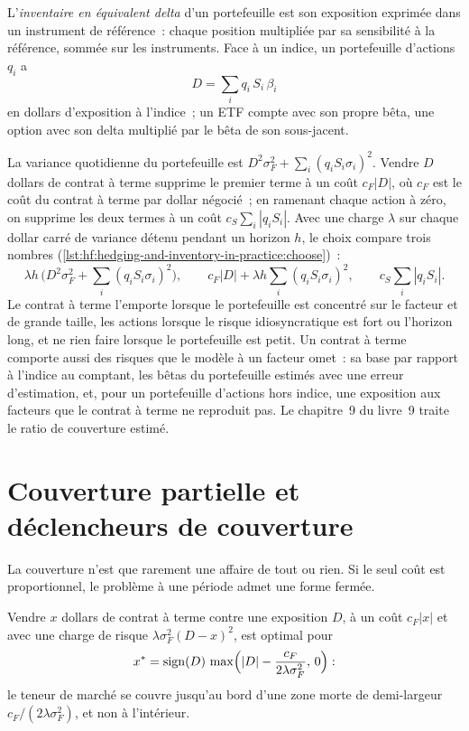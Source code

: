 \begin{definition}\label{def:hf:hedging-and-inventory-in-practice:delta}
L'\emph{inventaire en équivalent delta} d'un portefeuille est son exposition exprimée dans un instrument de référence~: chaque
position multipliée par sa sensibilité à la référence, sommée sur les instruments. Face à un indice, un portefeuille d'actions $q_i$ a
\[
D=\sum_i q_i\,S_i\,\beta_i
\]
en dollars d'exposition à l'indice~; un ETF compte avec son propre bêta, une option avec son delta multiplié par le bêta de son sous-jacent.
\end{definition}

La variance quotidienne du portefeuille est $D^2\sigma_F^2+\sum_i (q_iS_i\sigma_i)^2$. Vendre $D$ dollars de contrat à terme supprime le premier terme à un coût $c_F|D|$,
où $c_F$ est le coût du contrat à terme par dollar négocié~; en ramenant chaque action à zéro, on supprime les deux termes à un coût $c_S\sum_i|q_iS_i|$. Avec une charge $\lambda$
sur chaque dollar carré de variance détenu pendant un horizon $h$, le choix compare trois nombres (\cref{lst:hf:hedging-and-inventory-in-practice:choose})~:
\[
\lambda h\,\bigl(D^2\sigma_F^2+\textstyle\sum_i(q_iS_i\sigma_i)^2\bigr),\qquad c_F|D|+\lambda h\textstyle\sum_i(q_iS_i\sigma_i)^2,\qquad c_S\textstyle\sum_i|q_iS_i|.
\]
Le contrat à terme l'emporte lorsque le portefeuille est concentré sur le facteur et de grande taille, les actions lorsque le risque idiosyncratique est fort ou l'horizon long, et ne
rien faire lorsque le portefeuille est petit. Un contrat à terme comporte aussi des risques que le modèle à un facteur omet~: sa base par rapport à l'indice au comptant, les bêtas du portefeuille estimés avec
une erreur d'estimation, et, pour un portefeuille d'actions hors indice, une exposition aux facteurs que le contrat à terme ne reproduit pas. Le chapitre~9 du livre~9 traite le
ratio de couverture estimé.

\section{Couverture partielle et déclencheurs de couverture}

La couverture n'est que rarement une affaire de tout ou rien. Si le seul coût est proportionnel, le problème à une période admet une forme fermée.

\begin{proposition}\label{prop:hf:hedging-and-inventory-in-practice:dead}
Vendre $x$ dollars de contrat à terme contre une exposition $D$, à un coût $c_F|x|$ et avec une charge de risque $\lambda\sigma_F^2(D-x)^2$, est optimal pour
\[
x^\ast=\operatorname{sign}(D)\,\max\Bigl(|D|-\frac{c_F}{2\lambda\sigma_F^2},\,0\Bigr):
\]
le teneur de marché se couvre jusqu'au bord d'une zone morte de demi-largeur $c_F/(2\lambda\sigma_F^2)$, et non à l'intérieur.
\end{proposition}

